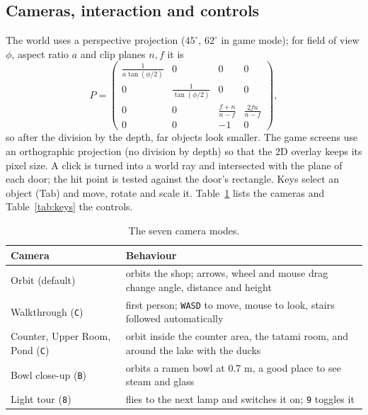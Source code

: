 \documentclass[10pt,a4paper]{article}
\newcommand{\code}[1]{\texttt{\small #1}}
\begin{document}
\subsection{Cameras, interaction and controls}\label{sec:cam}
The world uses a perspective projection ($45^\circ$, $62^\circ$ in game mode); for field of view $\phi$, aspect ratio $a$ and clip planes $n,f$ it is
\begin{equation}
P=\begin{pmatrix}\frac{1}{a\tan(\phi/2)}&0&0&0\\0&\frac{1}{\tan(\phi/2)}&0&0\\0&0&\frac{f+n}{n-f}&\frac{2fn}{n-f}\\0&0&-1&0\end{pmatrix},
\end{equation}
so after the division by the depth, far objects look smaller. The game screens use an orthographic projection (no division by depth) so that the 2D overlay keeps its pixel size. A click is turned into a world ray and intersected with the plane of each door; the hit point is tested against the door's rectangle. Keys select an object (Tab) and move, rotate and scale it. Table~\ref{tab:cam} lists the cameras and Table~\ref{tab:keys} the controls.
\begin{table}[htbp]
\centering\small
\begin{tabular}{@{}p{3.8cm}p{12.1cm}@{}}
\toprule
\textbf{Camera} & \textbf{Behaviour}\\
\midrule
Orbit (default) & orbits the shop; arrows, wheel and mouse drag change angle, distance and height\\
Walkthrough (\code{C}) & first person; \code{WASD} to move, mouse to look, stairs followed automatically\\
Counter, Upper Room, Pond (\code{C}) & orbit inside the counter area, the tatami room, and around the lake with the ducks\\
Bowl close-up (\code{B}) & orbits a ramen bowl at 0.7 m, a good place to see steam and glass\\
Light tour (\code{8}) & flies to the next lamp and switches it on; \code{9} toggles it\\
\bottomrule
\end{tabular}
\caption{The seven camera modes.}\label{tab:cam}
\end{table}
\end{document}
